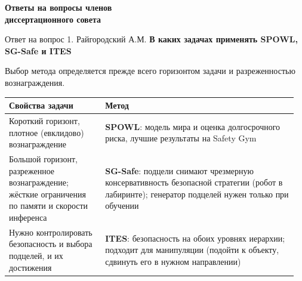 \begin{frame}
    \centering
    \vfill
    {\LARGE\color{MIPTBlue}\textbf{Ответы на вопросы членов\\[0.2em]
    диссертационного совета}}
    \vfill
\end{frame}



\begin{frame}[noframenumbering]{Ответ на вопрос 1. Райгородский А.М.}
    \small
    \textbf{В каких задачах применять SPOWL, SG-Safe и ITES}

    \vspace{0.4em}
    Выбор метода определяется прежде всего горизонтом задачи и разреженностью
    вознаграждения.

    \vspace{0.6em}
    \renewcommand{\arraystretch}{1.35}
    \begin{tabular}{@{}>{\raggedright\arraybackslash}p{0.32\linewidth}>{\raggedright\arraybackslash}p{0.64\linewidth}@{}}
        \toprule
        \textbf{Свойства задачи} & \textbf{Метод} \\
        \midrule
        Короткий горизонт, плотное (евклидово) вознаграждение
            & \textbf{SPOWL}: модель мира и оценка долгосрочного риска,
              лучшие результаты на Safety Gym \\
        \midrule[0.2pt]
        Большой горизонт, разреженное вознаграждение; жёсткие ограничения
        по памяти и скорости инференса
            & \textbf{SG-Safe}: подцели снимают чрезмерную консервативность
              безопасной стратегии (робот в лабиринте); генератор подцелей
              нужен только при обучении \\
        \midrule[0.2pt]
        Нужно контролировать безопасность и выбора подцелей, и их достижения
            & \textbf{ITES}: безопасность на обоих уровнях иерархии; подходит
              для манипуляции (подойти к объекту, сдвинуть его в нужном
              направлении) \\
        \bottomrule
    \end{tabular}
\end{frame}

